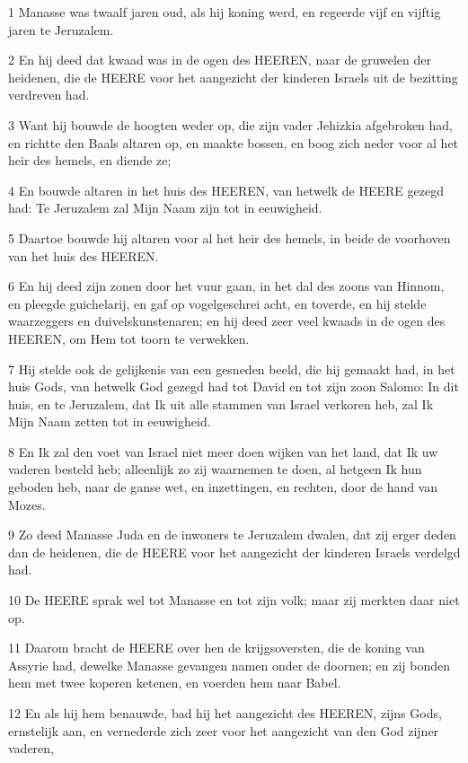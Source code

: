 \par 1 Manasse was twaalf jaren oud, als hij koning werd, en regeerde vijf en vijftig jaren te Jeruzalem.
\par 2 En hij deed dat kwaad was in de ogen des HEEREN, naar de gruwelen der heidenen, die de HEERE voor het aangezicht der kinderen Israels uit de bezitting verdreven had.
\par 3 Want hij bouwde de hoogten weder op, die zijn vader Jehizkia afgebroken had, en richtte den Baals altaren op, en maakte bossen, en boog zich neder voor al het heir des hemels, en diende ze;
\par 4 En bouwde altaren in het huis des HEEREN, van hetwelk de HEERE gezegd had: Te Jeruzalem zal Mijn Naam zijn tot in eeuwigheid.
\par 5 Daartoe bouwde hij altaren voor al het heir des hemels, in beide de voorhoven van het huis des HEEREN.
\par 6 En hij deed zijn zonen door het vuur gaan, in het dal des zoons van Hinnom, en pleegde guichelarij, en gaf op vogelgeschrei acht, en toverde, en hij stelde waarzeggers en duivelskunstenaren; en hij deed zeer veel kwaads in de ogen des HEEREN, om Hem tot toorn te verwekken.
\par 7 Hij stelde ook de gelijkenis van een gesneden beeld, die hij gemaakt had, in het huis Gods, van hetwelk God gezegd had tot David en tot zijn zoon Salomo: In dit huis, en te Jeruzalem, dat Ik uit alle stammen van Israel verkoren heb, zal Ik Mijn Naam zetten tot in eeuwigheid.
\par 8 En Ik zal den voet van Israel niet meer doen wijken van het land, dat Ik uw vaderen besteld heb; alleenlijk zo zij waarnemen te doen, al hetgeen Ik hun geboden heb, naar de ganse wet, en inzettingen, en rechten, door de hand van Mozes.
\par 9 Zo deed Manasse Juda en de inwoners te Jeruzalem dwalen, dat zij erger deden dan de heidenen, die de HEERE voor het aangezicht der kinderen Israels verdelgd had.
\par 10 De HEERE sprak wel tot Manasse en tot zijn volk; maar zij merkten daar niet op.
\par 11 Daarom bracht de HEERE over hen de krijgsoversten, die de koning van Assyrie had, dewelke Manasse gevangen namen onder de doornen; en zij bonden hem met twee koperen ketenen, en voerden hem naar Babel.
\par 12 En als hij hem benauwde, bad hij het aangezicht des HEEREN, zijns Gods, ernstelijk aan, en vernederde zich zeer voor het aangezicht van den God zijner vaderen,

